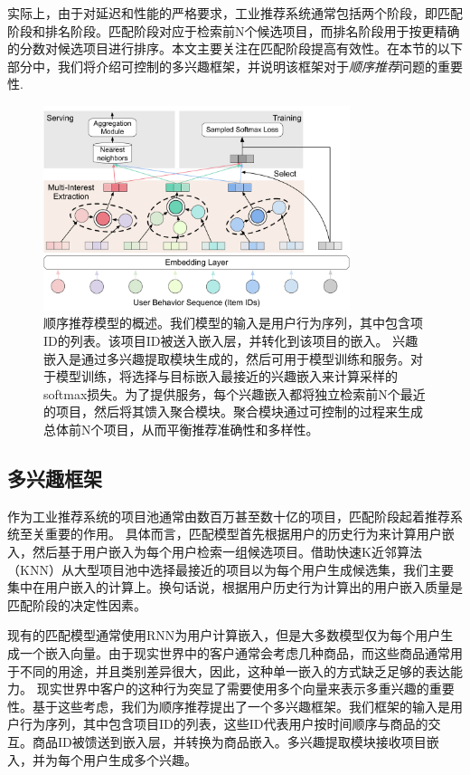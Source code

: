实际上，由于对延迟和性能的严格要求，工业推荐系统通常包括两个阶段，即匹配阶段和排名阶段。匹配阶段对应于检索前N个候选项目，而排名阶段用于按更精确的分数对候选项目进行排序。本文主要关注在匹配阶段提高有效性。在本节的以下部分中，我们将介绍可控制的多兴趣框架，并说明该框架对于\textit{顺序推荐}问题的重要性. %

\begin{figure}
    \centering
    \includegraphics[width=0.8\textwidth]{figures/multi-interest-framework.pdf}
    \caption{顺序推荐模型的概述。我们模型的输入是用户行为序列，其中包含项ID的列表。该项目ID被送入嵌入层，并转化到该项目的嵌入。 兴趣嵌入是通过多兴趣提取模块生成的，然后可用于模型训练和服务。对于模型训练，将选择与目标嵌入最接近的兴趣嵌入来计算采样的softmax损失。为了提供服务，每个兴趣嵌入都将独立检索前N个最近的项目，然后将其馈入聚合模块。聚合模块通过可控制的过程来生成总体前N个项目，从而平衡推荐准确性和多样性。 }
    \label{fig:capsule_matching}
\end{figure}

\subsection{多兴趣框架}
作为工业推荐系统的项目池通常由数百万甚至数十亿的项目，匹配阶段起着推荐系统至关重要的作用。 具体而言，匹配模型首先根据用户的历史行为来计算用户嵌入，然后基于用户嵌入为每个用户检索一组候选项目。借助快速K近邻算法（KNN）从大型项目池中选择最接近的项目以为每个用户生成候选集，我们主要集中在用户嵌入的计算上。换句话说，根据用户历史行为计算出的用户嵌入质量是匹配阶段的决定性因素。

现有的匹配模型通常使用RNN\cite{hidasi2015session,wu2017recurrent}为用户计算嵌入，但是大多数模型仅为每个用户生成一个嵌入向量。由于现实世界中的客户通常会考虑几种商品，而这些商品通常用于不同的用途，并且类别差异很大，因此，这种单一嵌入的方式缺乏足够的表达能力。 现实世界中客户的这种行为突显了需要使用多个向量来表示多重兴趣的重要性。基于这些考虑，我们为顺序推荐提出了一个多兴趣框架。我们框架的输入是用户行为序列，其中包含项目ID的列表，这些ID代表用户按时间顺序与商品的交互。商品ID被馈送到嵌入层，并转换为商品嵌入。多兴趣提取模块接收项目嵌入，并为每个用户生成多个兴趣。

